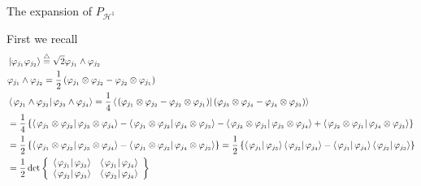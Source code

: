 \documentclass[aps,preprint]{revtex4}%
\begin{document}
The expansion of $P_{\mathcal{H}^{1}}$

First we recall
\begin{align}
&  \left\vert \varphi_{j_{1}}\varphi_{j_{2}}\right\rangle
\overset{\bigtriangleup}{=}\sqrt{2}\varphi_{j_{1}}\wedge\varphi_{j_{2}%
}\nonumber\\
&  \varphi_{j_{1}}\wedge\varphi_{j_{2}}=\frac{1}{2}\left(  \varphi_{j_{1}%
}\otimes\varphi_{j_{2}}-\varphi_{j_{2}}\otimes\varphi_{j_{1}}\right)
\nonumber\\
&  \left\langle \left.  \varphi_{j_{1}}\wedge\varphi_{j_{2}}\right\vert
\varphi_{j_{3}}\wedge\varphi_{j_{4}}\right\rangle =\frac{1}{4}\left\langle
\left.  \left(  \varphi_{j_{1}}\otimes\varphi_{j_{2}}-\varphi_{j_{2}}%
\otimes\varphi_{j_{1}}\right)  \right\vert \left(  \varphi_{j_{3}}%
\otimes\varphi_{j_{4}}-\varphi_{j_{4}}\otimes\varphi_{j_{3}}\right)
\right\rangle \nonumber\\
&  =\frac{1}{4}\left\{  \left\langle \left.  \varphi_{j_{1}}\otimes
\varphi_{j_{2}}\right\vert \varphi_{j_{3}}\otimes\varphi_{j_{4}}\right\rangle
-\left\langle \left.  \varphi_{j_{1}}\otimes\varphi_{j_{2}}\right\vert
\varphi_{j_{4}}\otimes\varphi_{j_{3}}\right\rangle -\left\langle \left.
\varphi_{j_{2}}\otimes\varphi_{j_{1}}\right\vert \varphi_{j_{3}}\otimes
\varphi_{j_{4}}\right\rangle +\left\langle \left.  \varphi_{j_{2}}%
\otimes\varphi_{j_{1}}\right\vert \varphi_{j_{4}}\otimes\varphi_{j_{3}%
}\right\rangle \right\} \nonumber\\
&  =\frac{1}{2}\left\{  \left\langle \left.  \varphi_{j_{1}}\otimes
\varphi_{j_{2}}\right\vert \varphi_{j_{3}}\otimes\varphi_{j_{4}}\right\rangle
-\left\langle \left.  \varphi_{j_{1}}\otimes\varphi_{j_{2}}\right\vert
\varphi_{j_{4}}\otimes\varphi_{j_{3}}\right\rangle \right\}  =\frac{1}%
{2}\left\{  \left\langle \left.  \varphi_{j_{1}}\right\vert \varphi_{j_{3}%
}\right\rangle \left\langle \left.  \varphi_{j_{2}}\right\vert \varphi_{j_{4}%
}\right\rangle -\left\langle \left.  \varphi_{j_{1}}\right\vert \varphi
_{j_{4}}\right\rangle \left\langle \left.  \varphi_{j_{2}}\right\vert
\varphi_{j_{3}}\right\rangle \right\} \nonumber\\
&  =\frac{1}{2}\det\left\{
\begin{array}
[c]{cc}%
\left\langle \left.  \varphi_{j_{1}}\right\vert \varphi_{j_{3}}\right\rangle
& \left\langle \left.  \varphi_{j_{1}}\right\vert \varphi_{j_{4}}\right\rangle
\\
\left\langle \left.  \varphi_{j_{2}}\right\vert \varphi_{j_{3}}\right\rangle
& \left\langle \left.  \varphi_{j_{2}}\right\vert \varphi_{j_{4}%
}\right\rangle
\end{array}
\right\}
\end{align}
\end{document}
